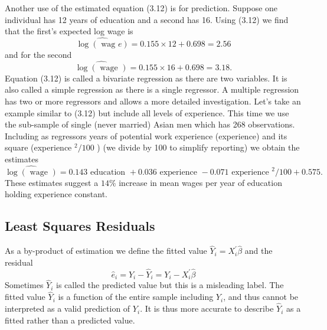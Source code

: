 \documentclass[10pt]{article}
\begin{document}
Another use of the estimated equation (3.12) is for prediction. Suppose one individual has 12 years of education and a second has 16. Using (3.12) we find that the first's expected log wage is
$$
\widehat{\log (\text { wag } e)}=0.155 \times 12+0.698=2.56
$$
and for the second
$$
\widehat{\log (\text { wage })}=0.155 \times 16+0.698=3.18 .
$$
Equation (3.12) is called a bivariate regression as there are two variables. It is also called a simple regression as there is a single regressor. A multiple regression has two or more regressors and allows a more detailed investigation. Let's take an example similar to (3.12) but include all levels of experience. This time we use the sub-sample of single (never married) Asian men which has 268 observations. Including as regressors years of potential work experience (experience) and its square (experience ${ }^{2} / 100$ ) (we divide by 100 to simplify reporting) we obtain the estimates
$$
\widehat{\log (\text { wage })}=0.143 \text { education }+0.036 \text { experience }-0.071 \text { experience }^{2} / 100+0.575 \text {. }
$$
These estimates suggest a $14 \%$ increase in mean wages per year of education holding experience constant.

\subsection{Least Squares Residuals}
As a by-product of estimation we define the fitted value $\widehat{Y}_{i}=X_{i}^{\prime} \widehat{\beta}$ and the residual
$$
\widehat{e}_{i}=Y_{i}-\widehat{Y}_{i}=Y_{i}-X_{i}^{\prime} \widehat{\beta}
$$
Sometimes $\widehat{Y}_{i}$ is called the predicted value but this is a misleading label. The fitted value $\widehat{Y}_{i}$ is a function of the entire sample including $Y_{i}$, and thus cannot be interpreted as a valid prediction of $Y_{i}$. It is thus more accurate to describe $\widehat{Y}_{i}$ as a fitted rather than a predicted value.
\end{document}

